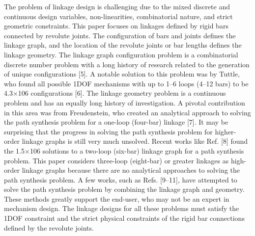 The problem of linkage design is challenging due to the mixed discrete and continuous design variables, non-linearities, combinatorial nature, and strict geometric constraints. This paper focuses on linkages defined by rigid bars connected by revolute joints. The configuration of bars and joints defines the linkage graph, and the location of the revolute joints or bar lengths defines the linkage geometry. The linkage graph configuration problem is a combinatorial discrete number problem with a long history of research related to the generation of unique configurations [5]. A notable solution to this problem was by Tuttle, who found all possible 1DOF mechanisms with up to 1–6 loops (4–12 bars) to be 4.3×106 configurations [6]. The linkage geometry problem is a continuous problem and has an equally long history of investigation. A pivotal contribution in this area was from Freudenstein, who created an analytical approach to solving the path synthesis problem for a one-loop (four-bar) linkage [7]. It may be surprising that the progress in solving the path synthesis problem for higher-order linkage graphs is still very much unsolved. Recent works like Ref. [8] found the 1.5×106 solutions to a two-loop (six-bar) linkage graph for a path synthesis problem. This paper considers three-loop (eight-bar) or greater linkages as high-order linkage graphs because there are no analytical approaches to solving the path synthesis problem. A few works, such as Refs. [9–11], have attempted to solve the path synthesis problem by combining the linkage graph and geometry. These methods greatly support the end-user, who may not be an expert in mechanism design. The linkage designs for all these problems must satisfy the 1DOF constraint and the strict physical constraints of the rigid bar connections defined by the revolute joints.

